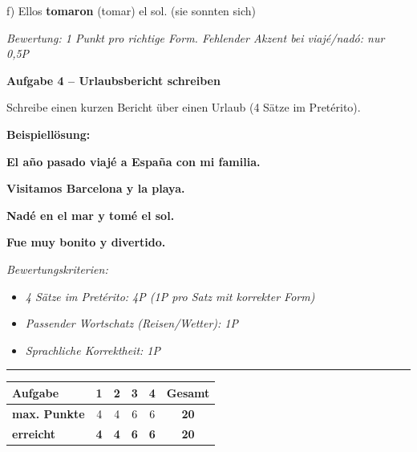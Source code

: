 \documentclass[11pt, a4paper]{article}
\newcommand{\fachfarbe}{spanisch}
\newcommand{\punktebox}[1]{\hfill\fbox{\small \_/#1}}
\newcommand{\lsg}[1]{\textcolor{loesung}{\textbf{#1}}}
\newenvironment{aufgabe}[1]{%
    \needspace{5\baselineskip}%
    \nopagebreak[4]%
    \vspace{10pt}
    \noindent\textbf{\textcolor{\fachfarbe}{Aufgabe #1}}
    \nopagebreak[4]%
    \vspace{5pt}
    \nopagebreak[4]%
    \begin{list}{}{\leftmargin=0pt}
    \item[]
}{%
    \end{list}
}
\begin{document}
\vspace{0.8em}

\noindent
f) Ellos \lsg{tomaron} (tomar) el sol. \hfill (sie sonnten sich)

\textit{\textcolor{grau}{Bewertung: 1 Punkt pro richtige Form. Fehlender Akzent bei viajé/nadó: nur 0,5P}}

\vspace{15pt}


\begin{aufgabe}{4 -- Urlaubsbericht schreiben}
Schreibe einen kurzen Bericht über einen Urlaub (4 Sätze im Pretérito). \punktebox{6}
\end{aufgabe}

\textbf{Beispiellösung:}

\lsg{El año pasado viajé a España con mi familia.}

\lsg{Visitamos Barcelona y la playa.}

\lsg{Nadé en el mar y tomé el sol.}

\lsg{Fue muy bonito y divertido.}

\vspace{0.5em}

\textit{\textcolor{grau}{Bewertungskriterien:}}
\begin{itemize}[nosep]
    \item \textit{\textcolor{grau}{4 Sätze im Pretérito: 4P (1P pro Satz mit korrekter Form)}}
    \item \textit{\textcolor{grau}{Passender Wortschatz (Reisen/Wetter): 1P}}
    \item \textit{\textcolor{grau}{Sprachliche Korrektheit: 1P}}
\end{itemize}


\vspace{25pt}
\hrule
\vspace{10pt}

\noindent
\begin{tabularx}{\textwidth}{|X|c|c|c|c||c|}
\hline
\textbf{Aufgabe} & 1 & 2 & 3 & 4 & \textbf{Gesamt} \\
\hline
\textbf{max. Punkte} & 4 & 4 & 6 & 6 & \textbf{20} \\
\hline
\textbf{erreicht} & \lsg{4} & \lsg{4} & \lsg{6} & \lsg{6} & \lsg{20} \\
\hline
\end{tabularx}
\end{document}
